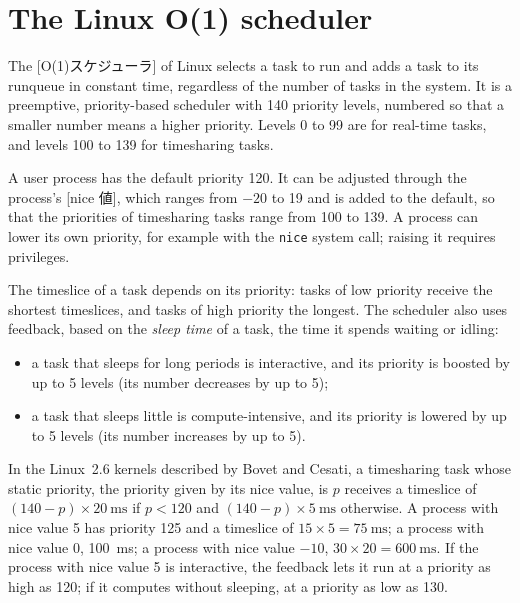 \documentclass[../main.tex]{subfiles}
\begin{document}
\section{The Linux O(1) scheduler}
\label{sec:l07-o1}

The [O(1)スケジューラ] of Linux
selects a task to run and adds a task to its runqueue in constant time,
regardless of the number of tasks in the system.  It is a preemptive,
priority-based scheduler with 140 priority levels, numbered so that a
smaller number means a higher priority.  Levels 0 to 99 are for real-time
tasks, and levels 100 to 139 for timesharing tasks.

A user process has the default priority 120.  It can be adjusted through
the process's [nice 値], which ranges from $-20$ to 19 and
is added to the default, so that the priorities of timesharing tasks range
from 100 to 139.  A process can lower its own priority, for example with
the \texttt{nice} system call; raising it requires privileges.

The timeslice of a task depends on its priority: tasks of low priority
receive the shortest timeslices, and tasks of high priority the longest.
The scheduler also uses feedback, based on the \emph{sleep time} of a task,
the time it spends waiting or idling:
\begin{itemize}
  \item a task that sleeps for long periods is interactive, and its priority
    is boosted by up to 5 levels (its number decreases by up to 5);
  \item a task that sleeps little is compute-intensive, and its priority is
    lowered by up to 5 levels (its number increases by up to 5).
\end{itemize}

\begin{example}
  In the Linux~2.6 kernels described by Bovet and Cesati, a timesharing
  task whose static priority, the priority given by its nice value, is $p$
  receives a timeslice of $(140 - p) \times
  \SI{20}{\milli\second}$ if $p < 120$ and $(140 - p) \times
  \SI{5}{\milli\second}$ otherwise.  A process with nice value 5 has
  priority 125 and a timeslice of $15 \times 5 = \SI{75}{\milli\second}$; a
  process with nice value 0, \SI{100}{\milli\second}; a process with nice
  value $-10$, $30 \times 20 = \SI{600}{\milli\second}$.  If the process with
  nice value 5 is interactive, the feedback lets it run at a priority as high
  as 120; if it computes without sleeping, at a priority as low as
  130.
\end{example}
\end{document}
